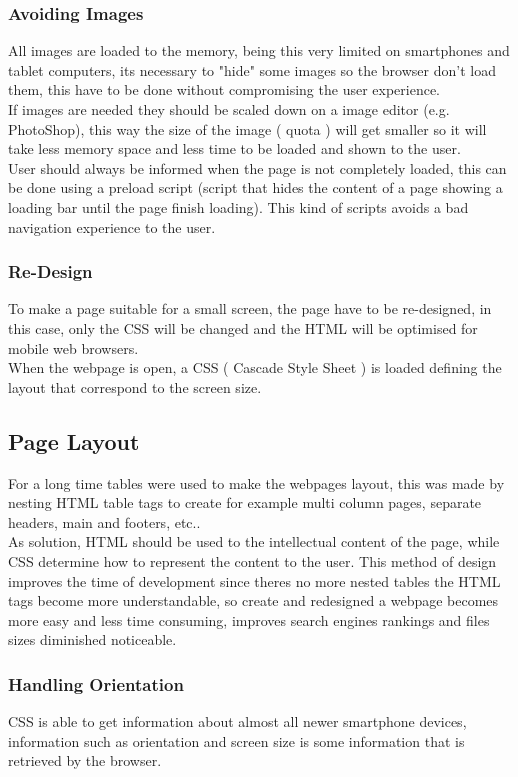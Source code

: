 \subsubsection{Avoiding Images}
All images are loaded to the memory, being this very limited on smartphones and tablet computers, its necessary to "hide" some images so the browser don't load them, this have to be done without compromising the user experience.\\
If images are needed they should be scaled down on a image editor (e.g. PhotoShop), this way the size of the image ( quota ) will get smaller so it will take less memory space and less time to be loaded and shown to the user.\\
User should always be informed when the page is not completely loaded, this can be done using a preload script (script that hides the content of a page showing a loading bar until the page finish loading). This kind of scripts avoids a bad navigation experience to the user.\\

\subsubsection{Re-Design}
To make a page suitable for a small screen, the page have to be re-designed, in this case, only the CSS will be changed and the HTML will be optimised for mobile web browsers.\\ 
When the webpage is open, a CSS ( Cascade Style Sheet ) is loaded defining the layout that correspond to the screen size.

\subsection{Page Layout}
For a long time tables were used to make the webpages layout, this was made by nesting HTML table tags to create for example multi column pages, separate headers, main and footers, etc..\\ As solution, HTML should be used to the intellectual content of the page, while CSS determine how to represent the content to the user. This method of design improves the time of development since theres no more nested tables the HTML tags become more understandable, so create and redesigned a webpage becomes more easy and less time consuming, improves search engines rankings and files sizes diminished noticeable.\\

\subsubsection{Handling Orientation}  %
CSS is able to get information about almost all newer smartphone devices, information such as orientation and screen size is some information that is retrieved by the browser.\\
